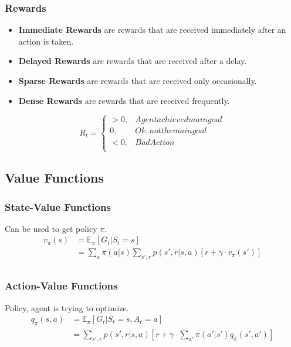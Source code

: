 \documentclass[10pt, landscape, a4paper]{article}
\begin{document}
\begin{multicols}{3}
        \subsubsection{Rewards}
        \begin{itemize}
            \item \textbf{Immediate Rewards} are rewards that are received immediately after an action is taken.
            \item \textbf{Delayed Rewards} are rewards that are received after a delay.
            \item \textbf{Sparse Rewards} are rewards that are received only occasionally.
            \item \textbf{Dense Rewards} are rewards that are received frequently.
        \end{itemize}
        \begin{equation}
            R_t =
            \begin{cases*}
                >0, & Agent achieved main goal\\
                0, & Ok, not the main goal \\
                <0, & Bad Action\\
            \end{cases*}
        \end{equation}

        \subsection{Value Functions}

        \subsubsection{State-Value Functions}
        Can be used to get policy $\pi$.
        \begin{equation}
            \begin{split}
                v_\pi(s) &= \mathbb{E}_\pi\left[ G_t | S_t = s \right] \\
                &= \sum_{a}\pi(a|s)\sum_{s',r} p(s',r|s,a) \left[ r + \gamma \cdot v_\pi(s') \right] \\
            \end{split}
        \end{equation}

        \subsubsection{Action-Value Functions}
        Policy, agent is trying to optimize.
        \begin{equation}
            \begin{split}
                q_\pi(s,a) &= \mathbb{E}_\pi\left[ G_t | S_t = s, A_t = a \right] \\
                &= \sum_{s',r} p(s',r|s,a) \left[ r + \gamma \cdot \sum_{a'} \pi(a'|s') q_\pi(s',a') \right] \\
            \end{split}
        \end{equation}


\end{multicols}
\end{document}

